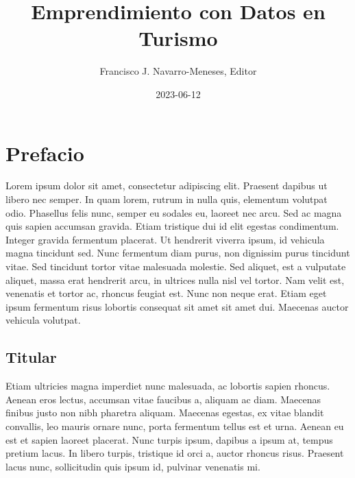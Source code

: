 \documentclass[
  letterpaper,
  DIV=11,
  numbers=noendperiod]{scrreprt}
\title{Emprendimiento con Datos en Turismo}
\author{Francisco J. Navarro-Meneses, Editor}
\date{2023-06-12}
\renewcommand*\contentsname{Table of contents}
\newcommand\contentsname{Table of contents}
\begin{document}
\maketitle
\ifdefined\Shaded\renewenvironment{Shaded}{\begin{tcolorbox}[interior hidden, frame hidden, boxrule=0pt, borderline west={3pt}{0pt}{shadecolor}, breakable, enhanced, sharp corners]}{\end{tcolorbox}}\fi

\renewcommand*\contentsname{Table of contents}
{
\hypersetup{linkcolor=}
\setcounter{tocdepth}{2}
\tableofcontents
}

\hypertarget{prefacio}{%
\chapter*{Prefacio}\label{prefacio}}


Lorem ipsum dolor sit amet, consectetur adipiscing elit. Praesent
dapibus ut libero nec semper. In quam lorem, rutrum in nulla quis,
elementum volutpat odio. Phasellus felis nunc, semper eu sodales eu,
laoreet nec arcu. Sed ac magna quis sapien accumsan gravida. Etiam
tristique dui id elit egestas condimentum. Integer gravida fermentum
placerat. Ut hendrerit viverra ipsum, id vehicula magna tincidunt sed.
Nunc fermentum diam purus, non dignissim purus tincidunt vitae. Sed
tincidunt tortor vitae malesuada molestie. Sed aliquet, est a vulputate
aliquet, massa erat hendrerit arcu, in ultrices nulla nisl vel tortor.
Nam velit est, venenatis et tortor ac, rhoncus feugiat est. Nunc non
neque erat. Etiam eget ipsum fermentum risus lobortis consequat sit amet
sit amet dui. Maecenas auctor vehicula volutpat.

\hypertarget{titular}{%
\section*{Titular}\label{titular}}


Etiam ultricies magna imperdiet nunc malesuada, ac lobortis sapien
rhoncus. Aenean eros lectus, accumsan vitae faucibus a, aliquam ac diam.
Maecenas finibus justo non nibh pharetra aliquam. Maecenas egestas, ex
vitae blandit convallis, leo mauris ornare nunc, porta fermentum tellus
est et urna. Aenean eu est et sapien laoreet placerat. Nunc turpis
ipsum, dapibus a ipsum at, tempus pretium lacus. In libero turpis,
tristique id orci a, auctor rhoncus risus. Praesent lacus nunc,
sollicitudin quis ipsum id, pulvinar venenatis mi.
\end{document}
